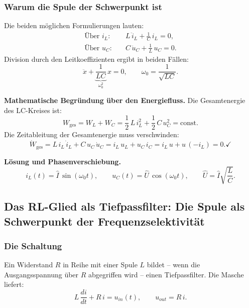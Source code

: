 ﻿\documentclass[12pt, a4paper]{article}
\begin{document}
	\subsubsection*{Warum die Spule der Schwerpunkt ist}
	
	Die beiden möglichen Formulierungen lauten:
	\begin{align}
		\text{Über } i_L{:}\quad &
		L\,\ddot{i}_L + \frac{1}{C}\,i_L = 0, \label{eq:lc_spule_form} \\
		\text{Über } u_C{:}\quad &
		C\,\ddot{u}_C + \frac{1}{L}\,u_C = 0. \label{eq:lc_kond_form}
	\end{align}
	Division durch den Leitkoeffizienten ergibt in beiden Fällen:
	\begin{equation}
		\ddot{x} + \underbrace{\frac{1}{LC}}_{\omega_0^2}\,x = 0,
		\qquad \omega_0 = \frac{1}{\sqrt{LC}}.
		\label{eq:lc_standardform}
	\end{equation}
	
	\textbf{Mathematische Begründung über den Energiefluss.}
	Die Gesamtenergie des LC-Kreises ist:
	\begin{equation}
		W_{\mathrm{ges}} = W_L + W_C
		= \frac{1}{2}\,L\,i_L^2 + \frac{1}{2}\,C\,u_C^2 = \mathrm{const}.
		\label{eq:lc_energie}
	\end{equation}
	Die Zeitableitung der Gesamtenergie muss verschwinden:
	\begin{equation}
		\dot{W}_{\mathrm{ges}}
		= L\,i_L\,\dot{i}_L + C\,u_C\,\dot{u}_C
		= i_L\,u_L + u_C\,i_C
		= i_L\,u + u\,(-i_L) = 0. \checkmark
	\end{equation}
	
	\textbf{Lösung und Phasenverschiebung.}
	\begin{equation}
		i_L(t) = \hat{I}\,\sin(\omega_0 t), \qquad
		u_C(t) = \hat{U}\,\cos(\omega_0 t),
		\qquad \hat{U} = \hat{I}\sqrt{\frac{L}{C}}.
		\label{eq:lc_loesung}
	\end{equation}
	
	\subsection{Das RL-Glied als Tiefpassfilter: Die Spule als Schwerpunkt der Frequenzselektivität}
	\label{sec:schwerpunkt_rl_tiefpass}
	
	\subsubsection*{Die Schaltung}
	
	Ein Widerstand $R$ in Reihe mit einer Spule $L$ bildet -- wenn die Ausgangsspannung
	über $R$ abgegriffen wird -- einen Tiefpassfilter. Die Masche liefert:
	\begin{equation}
		L\,\frac{di}{dt} + R\,i = u_{in}(t),
		\qquad u_{out} = R\,i.
		\label{eq:rl_tp_masche}
	\end{equation}
	
\end{document}
